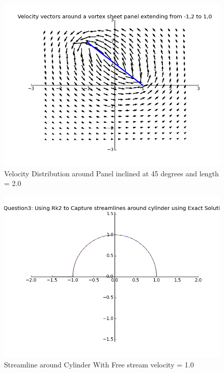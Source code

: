 \documentclass{article}
\begin{document}
\begin{figure}[H] \label{figure}
\includegraphics[width=12cm]{panel.png}
\caption{Velocity Distribution around Panel inclined at 45 degrees and length = 2.0 }
\label{figure:}
\end{figure}

\begin{figure}[H] \label{figure}
\includegraphics[width=12cm]{streamline_exact.png}
\caption{Streamline around Cylinder With Free stream velocity = 1.0}
\label{figure:}
\end{figure}
\end{document}

